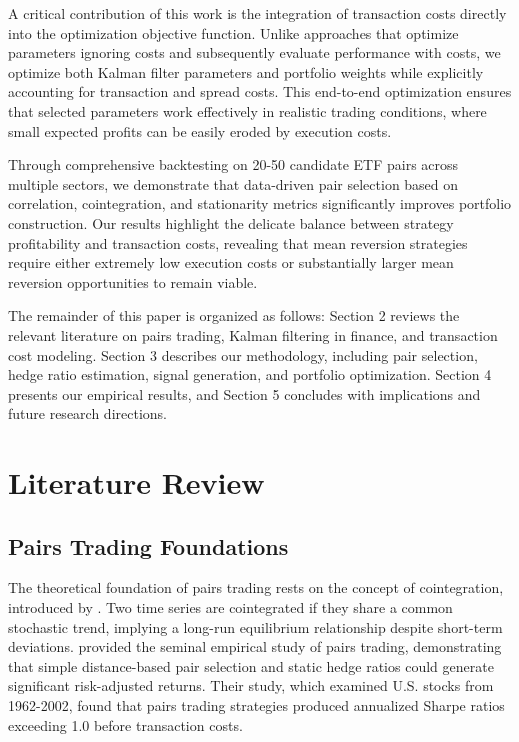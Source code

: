\documentclass[12pt]{article}
\begin{document}
A critical contribution of this work is the integration of transaction costs directly into the optimization objective function. Unlike approaches that optimize parameters ignoring costs and subsequently evaluate performance with costs, we optimize both Kalman filter parameters and portfolio weights while explicitly accounting for transaction and spread costs. This end-to-end optimization ensures that selected parameters work effectively in realistic trading conditions, where small expected profits can be easily eroded by execution costs.

Through comprehensive backtesting on 20-50 candidate ETF pairs across multiple sectors, we demonstrate that data-driven pair selection based on correlation, cointegration, and stationarity metrics significantly improves portfolio construction. Our results highlight the delicate balance between strategy profitability and transaction costs, revealing that mean reversion strategies require either extremely low execution costs or substantially larger mean reversion opportunities to remain viable.

The remainder of this paper is organized as follows: Section 2 reviews the relevant literature on pairs trading, Kalman filtering in finance, and transaction cost modeling. Section 3 describes our methodology, including pair selection, hedge ratio estimation, signal generation, and portfolio optimization. Section 4 presents our empirical results, and Section 5 concludes with implications and future research directions.

\section{Literature Review}

\subsection{Pairs Trading Foundations}

The theoretical foundation of pairs trading rests on the concept of cointegration, introduced by \citet{engle1987cointegration}. Two time series are cointegrated if they share a common stochastic trend, implying a long-run equilibrium relationship despite short-term deviations. \citet{gatev2006pairs} provided the seminal empirical study of pairs trading, demonstrating that simple distance-based pair selection and static hedge ratios could generate significant risk-adjusted returns. Their study, which examined U.S. stocks from 1962-2002, found that pairs trading strategies produced annualized Sharpe ratios exceeding 1.0 before transaction costs.
\end{document}
